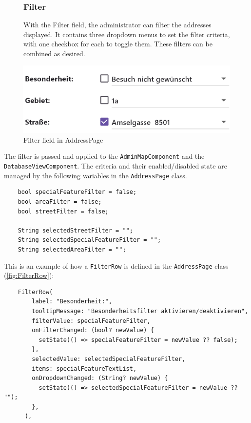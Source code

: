 \begin{figure}[H]
    \centering
    \begin{minipage}{0.55\textwidth} %
        \subsubsection{Filter}
        With the Filter field, the administrator can filter the addresses displayed. It contains three dropdown menus to set the filter criteria, with one checkbox for each to toggle them. These filters can be combined as desired. 
    \end{minipage}
    \hfill 
    \begin{minipage}{0.4\textwidth} %
        \centering
        \includegraphics[width=\linewidth]{images/AdminPanel/FilterField.png}
        \caption{Filter field in AddressPage}
        \label{fig:adminpanel_filter}
    \end{minipage}
\end{figure}

The filter is passed and applied to the \texttt{AdminMapComponent} and the \texttt{DatabaseViewComponent}. The criteria and their enabled/disabled state are managed by the following variables in the \texttt{AddressPage} class.
\lstset{style=mycsharp, caption=Filter variables in AddressPage}
\begin{lstlisting}
    bool specialFeatureFilter = false;
    bool areaFilter = false;
    bool streetFilter = false;
    
    String selectedStreetFilter = "";
    String selectedSpecialFeatureFilter = "";
    String selectedAreaFilter = "";
\end{lstlisting}

This is an example of how a \texttt{FilterRow} is defined in the \texttt{AddressPage} class (\ref{fig:FilterRow}):
\lstset{style=mycsharp, caption=FilterRow in AddressPage}
\begin{lstlisting}
    FilterRow(
        label: "Besonderheit:",
        tooltipMessage: "Besonderheitsfilter aktivieren/deaktivieren",
        filterValue: specialFeatureFilter,
        onFilterChanged: (bool? newValue) {
          setState(() => specialFeatureFilter = newValue ?? false);
        },
        selectedValue: selectedSpecialFeatureFilter,
        items: specialFeatureTextList,
        onDropdownChanged: (String? newValue) {
          setState(() => selectedSpecialFeatureFilter = newValue ?? "");
        },
      ),
\end{lstlisting}


